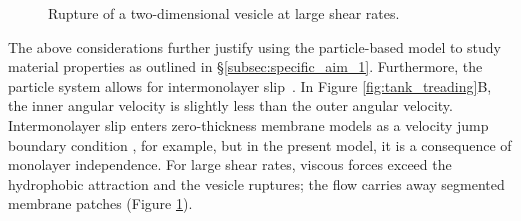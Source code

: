 \begin{figure}
  \caption{\label{fig:flow_rupture} \footnotesize Rupture of a
  two-dimensional vesicle at large shear rates.}
\end{figure}
The above considerations further justify using the particle-based model
to study material properties as outlined in
\S\ref{subsec:specific_aim_1}. Furthermore, the particle system allows
for intermonolayer slip~\cite{SHKULIPA2005823, ShkulipaThesis}. In
Figure \ref{fig:tank_treading}B, the inner angular velocity is slightly
less than the outer angular velocity. Intermonolayer slip enters
zero-thickness membrane models as a velocity jump boundary condition
\cite{schwalbe_vlahovska_miksis_2010}, for example, but in the present
model, it is a consequence of monolayer independence. For large shear
rates, viscous forces exceed the hydrophobic attraction and the vesicle
ruptures; the flow carries away segmented membrane patches (Figure
\ref{fig:flow_rupture}). 








